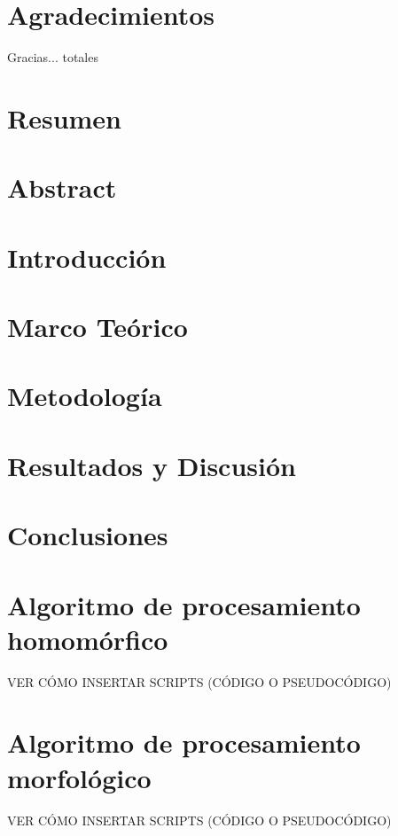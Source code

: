 \documentclass[11pt,a4paper]{report}
\begin{document}
\chapter*{Agradecimientos}
Gracias... totales
\chapter*{Resumen}  %

\chapter*{Abstract} %


\justifying
\chapter{Introducción}  
    
\chapter{Marco Teórico}
    
\chapter{Metodología}
    
\chapter{Resultados y Discusión}    
    
\chapter{Conclusiones}      
    
\appendix
\chapter{Algoritmo de procesamiento homomórfico}
%
\color{red} VER CÓMO INSERTAR SCRIPTS (CÓDIGO O PSEUDOCÓDIGO)
\color{black}
\chapter{Algoritmo de procesamiento morfológico}
\color{red} VER CÓMO INSERTAR SCRIPTS (CÓDIGO O PSEUDOCÓDIGO)
\color{black}
\end{document}
